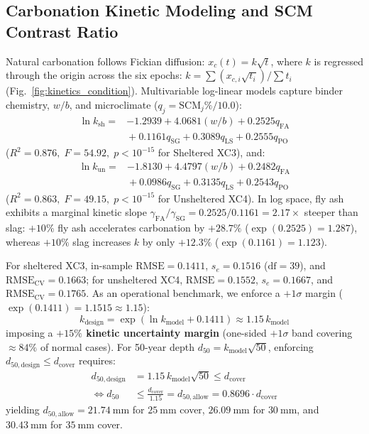 \documentclass[journal]{IEEEtran}
\begin{document}
\subsection{Carbonation Kinetic Modeling and SCM Contrast Ratio}
Natural carbonation follows Fickian diffusion: $x_c(t) = k\sqrt{t}$, where $k$ is regressed through the origin across the six epochs: $k = \sum (x_{c,i}\sqrt{t_i}) / \sum t_i$ (Fig.~\ref{fig:kinetics_condition}). Multivariable log-linear models capture binder chemistry, $w/b$, and microclimate ($q_j = \mathrm{SCM}_j\% / 10.0$):
\begin{align}
\ln k_{\mathrm{sh}} ={}& -1.2939 + 4.0681(w/b) + 0.2525 q_{\mathrm{FA}} \nonumber \\
&{}+ 0.1161 q_{\mathrm{SG}} + 0.3089 q_{\mathrm{LS}} + 0.2555 q_{\mathrm{PO}}
\label{eq:kin_sh}
\end{align}
($R^2 = 0.876,\; F = 54.92,\; p < 10^{-15}$ for Sheltered XC3), and:
\begin{align}
\ln k_{\mathrm{un}} ={}& -1.8130 + 4.4797(w/b) + 0.2482 q_{\mathrm{FA}} \nonumber \\
&{}+ 0.0986 q_{\mathrm{SG}} + 0.3135 q_{\mathrm{LS}} + 0.2543 q_{\mathrm{PO}}
\label{eq:kin_un}
\end{align}
($R^2 = 0.863,\; F = 49.15,\; p < 10^{-15}$ for Unsheltered XC4). In log space, fly ash exhibits a marginal kinetic slope $\gamma_{\mathrm{FA}} / \gamma_{\mathrm{SG}} = 0.2525 / 0.1161 = \mathbf{2.17\times}$ steeper than slag: $+10\%$ fly ash accelerates carbonation by $+28.7\%$ ($\exp(0.2525) = 1.287$), whereas $+10\%$ slag increases $k$ by only $+12.3\%$ ($\exp(0.1161) = 1.123$).

For sheltered XC3, in-sample $\mathrm{RMSE} = 0.1411$, $s_e = 0.1516$ ($\text{df} = 39$), and $\mathrm{RMSE}_{\mathrm{CV}} = 0.1663$; for unsheltered XC4, $\mathrm{RMSE} = 0.1552$, $s_e = 0.1667$, and $\mathrm{RMSE}_{\mathrm{CV}} = 0.1765$. As an operational benchmark, we enforce a $+1\sigma$ margin ($\exp(0.1411) = 1.1515 \approx 1.15$):
\begin{equation}
k_{\mathrm{design}} = \exp(\ln k_{\mathrm{model}} + 0.1411) \approx 1.15\,k_{\mathrm{model}}
\label{eq:k_margin}
\end{equation}
imposing a \textbf{$+15\%$ kinetic uncertainty margin} (one-sided $+1\sigma$ band covering $\approx 84\%$ of normal cases). For 50-year depth $d_{50} = k_{\mathrm{model}}\sqrt{50}$, enforcing $d_{50,\mathrm{design}} \le d_{\mathrm{cover}}$ requires:
\begin{align}
d_{50,\mathrm{design}} &= 1.15 \, k_{\mathrm{model}}\sqrt{50} \le d_{\mathrm{cover}} \nonumber \\
\iff d_{50} &\le \frac{d_{\mathrm{cover}}}{1.15} = d_{50,\mathrm{allow}} = 0.8696 \cdot d_{\mathrm{cover}}
\label{eq:d50_allow}
\end{align}
yielding $d_{50,\mathrm{allow}} = 21.74\ \mathrm{mm}$ for $25\ \mathrm{mm}$ cover, $26.09\ \mathrm{mm}$ for $30\ \mathrm{mm}$, and $30.43\ \mathrm{mm}$ for $35\ \mathrm{mm}$ cover.
\end{document}
